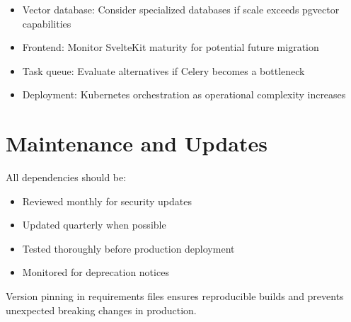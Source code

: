 \documentclass[12pt,a4paper]{report}
\begin{document}
\begin{itemize}
    \item Vector database: Consider specialized databases if scale exceeds pgvector capabilities
    \item Frontend: Monitor SvelteKit maturity for potential future migration
    \item Task queue: Evaluate alternatives if Celery becomes a bottleneck
    \item Deployment: Kubernetes orchestration as operational complexity increases
\end{itemize}

\section{Maintenance and Updates}

All dependencies should be:

\begin{itemize}
    \item Reviewed monthly for security updates
    \item Updated quarterly when possible
    \item Tested thoroughly before production deployment
    \item Monitored for deprecation notices
\end{itemize}

Version pinning in requirements files ensures reproducible builds and prevents unexpected breaking changes in production.
\end{document}
